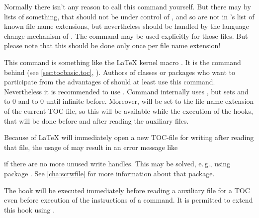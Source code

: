 Normally there isn't any reason to call this command yourself. But there may
by lists of something, that should not be under control of ,
and so are not in 's list of known file name extensions, but
nevertheless should be handled by the language change mechanism of
. The command may be used explicitly for those files. But please
note that this should be done only once per file name extension!%
\EndIndexGroup


\begin{Declaration}
\end{Declaration}
This command is something like the \LaTeX{} kernel macro
.  It is the
command behind  (see \autoref{sec:tocbasic.toc},
). Authors of classes or packages
who want to participate from the advantages of  should at
least use this command. Nevertheless it is recommended to use
. Command  internally uses
\Macro{\@starttoc}, but sets
 and  to 0
and  to 0 until infinite before. Moreover,
 will be set to
the file name extension of the current TOC-file, so this will be available
while the execution of the hooks, that will be done before and after reading
the auxiliary files.

Because of \LaTeX{} will immediately open a new TOC-file
for writing after reading that file, the usage of 
may result in an error message like
if there are no more unused write handles. This may be solved, e.\,g., using
package
.
See \autoref{cha:scrwfile} for more information about that package.%
\EndIndexGroup


\begin{Declaration}
\end{Declaration}
The hook  will be executed immediately before
reading a auxiliary file for a TOC even before execution of the instructions
of a  command. It is permitted to
extend this hook using .

